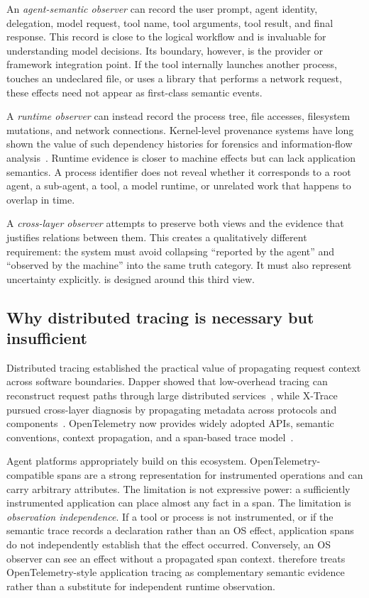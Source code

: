 An \emph{agent-semantic observer} can record the user prompt, agent identity, delegation, model request, tool name, tool arguments, tool result, and final response. This record is close to the logical workflow and is invaluable for understanding model decisions. Its boundary, however, is the provider or framework integration point. If the tool internally launches another process, touches an undeclared file, or uses a library that performs a network request, these effects need not appear as first-class semantic events.

A \emph{runtime observer} can instead record the process tree, file accesses, filesystem mutations, and network connections. Kernel-level provenance systems have long shown the value of such dependency histories for forensics and information-flow analysis~\cite{pohly2012hifi,bates2015lpm,pasquier2018runtime}. Runtime evidence is closer to machine effects but can lack application semantics. A process identifier does not reveal whether it corresponds to a root agent, a sub-agent, a tool, a model runtime, or unrelated work that happens to overlap in time.

A \emph{cross-layer observer} attempts to preserve both views and the evidence that justifies relations between them. This creates a qualitatively different requirement: the system must avoid collapsing ``reported by the agent'' and ``observed by the machine'' into the same truth category. It must also represent uncertainty explicitly. \system is designed around this third view.

\subsection{Why distributed tracing is necessary but insufficient}
Distributed tracing established the practical value of propagating request context across software boundaries. Dapper showed that low-overhead tracing can reconstruct request paths through large distributed services~\cite{sigelman2010dapper}, while X-Trace pursued cross-layer diagnosis by propagating metadata across protocols and components~\cite{fonseca2007xtrace}. OpenTelemetry now provides widely adopted APIs, semantic conventions, context propagation, and a span-based trace model~\cite{otel2026}.

Agent platforms appropriately build on this ecosystem. OpenTelemetry-compatible spans are a strong representation for instrumented operations and can carry arbitrary attributes. The limitation is not expressive power: a sufficiently instrumented application can place almost any fact in a span. The limitation is \emph{observation independence}. If a tool or process is not instrumented, or if the semantic trace records a declaration rather than an OS effect, application spans do not independently establish that the effect occurred. Conversely, an OS observer can see an effect without a propagated span context. \system therefore treats OpenTelemetry-style application tracing as complementary semantic evidence rather than a substitute for independent runtime observation.

